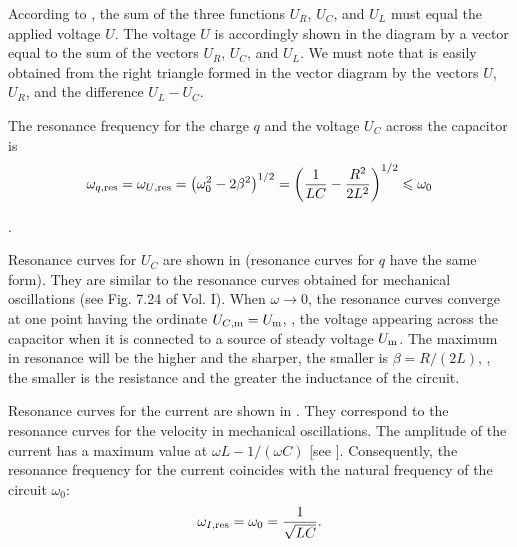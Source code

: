 \noindent
According to , the sum of the three functions $U_R$, $U_C$, and $U_L$ must equal the applied voltage $U$.
The voltage $U$ is accordingly shown in the diagram by a vector equal to the sum of the vectors $U_R$, $U_C$, and $U_L$.
We must note that  is easily obtained from the right triangle formed in the vector diagram by the vectors $U$, $U_R$, and the difference $U_L-U_C$.

The resonance frequency for the charge $q$ and the voltage $U_C$ across the capacitor is
\begin{equation}\label{eq:13_41}
    \omega_{\text{$q$,res}} = \omega_{\text{$U$,res}} = \left(\omega_0^2 - 2\beta^2\right)^{1/2} = \left(\frac{1}{LC} - \frac{R^2}{2L^2}\right)^{1/2}\leqslant \omega_0
\end{equation}

.

Resonance curves for $U_C$ are shown in  (resonance curves for $q$ have the same form).
They are similar to the resonance curves obtained for mechanical oscillations (see Fig. 7.24 of Vol. I).
When $\omega\to 0$, the resonance curves converge at one point having the ordinate $U_{\text{$C$,m}}=U_{\text{m}}$, \ie, the voltage appearing across the capacitor when it is connected to a source of steady voltage $U_{\text{m}}$.
The maximum in resonance will be the higher and the sharper, the smaller is $\beta=R/(2L)$, \ie, the smaller is the resistance and the greater the inductance of the circuit.

Resonance curves for the current are shown in .
They correspond to the resonance curves for the velocity in mechanical oscillations.
The amplitude of the current has a maximum value at
$\omega L - 1/(\omega C)$ [see ]. Consequently, the resonance frequency for the current coincides with the natural frequency of the circuit $\omega_0$:
\begin{equation}\label{eq:13_42}
    \omega_{\text{$I$,res}} = \omega_0 = \frac{1}{\sqrt{LC}}.
\end{equation}

